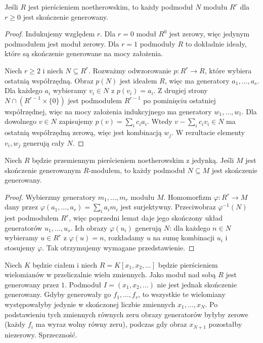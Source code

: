\begin{lemat}
\label{aa:lem:noether-submodules-free}
Jeśli $R$ jest pierścieniem noetherowskim, to każdy
podmoduł $N$ modułu $R^r$ dla $r\ge0$ jest
skończenie generowany.
\end{lemat}
\begin{proof}
Indukujemy względem $r$. Dla $r=0$ moduł $R^0$ jest zerowy,
więc jedynym podmodułem jest moduł zerowy.
Dla $r=1$ podmoduły $R$ to dokładnie ideały, które są
skończenie generowane na mocy założenia.

Niech $r\ge2$ i niech $N\subseteq R^r$.
Rozważmy odwzorowanie $p:R^r\to R$, które wybiera
ostatnią współrzędną. Obraz $p(N)$ jest ideałem $R$,
więc ma generatory $a_1,\ldots,a_s$.
Dla każdego $a_i$ wybieramy $v_i\in N$ z
$p(v_i)=a_i$. Z drugiej strony
$N\cap(R^{r-1}\times\{0\})$ jest podmodułem
$R^{r-1}$ po pominięciu ostatniej współrzędnej,
więc na mocy założenia indukcyjnego ma generatory
$w_1,\ldots,w_t$. Dla dowolnego $v\in N$ zapisujemy
$p(v)=\sum_i c_i a_i$. Wtedy
$v-\sum_i c_i v_i\in N$ ma ostatnią współrzędną zerową,
więc jest kombinacją $w_j$. W rezultacie elementy
$v_i,w_j$ generują cały $N$.
\end{proof}

\begin{twierdzenie}
\label{aa:tw:noether-submodules-fg}
Niech $R$ będzie przemiennym pierścieniem noetherowskim
z jedynką. Jeśli $M$ jest skończenie generowanym
$R$-modułem, to każdy podmoduł $N\subseteq M$
jest skończenie generowany.
\end{twierdzenie}
\begin{proof}
Wybierzmy generatory $m_1,\ldots,m_r$ modułu $M$.
Homomorfizm $\varphi:R^r\to M$ dany przez
$\varphi(a_1,\ldots,a_r)=\sum_i a_im_i$ jest
surjektywny. Przeciwobraz $\varphi^{-1}(N)$ jest
podmodułem $R^r$, więc poprzedni lemat daje jego
skończony układ generatorów $u_1,\ldots,u_s$.
Ich obrazy $\varphi(u_i)$ generują $N$: dla każdego
$n\in N$ wybieramy $u\in R^r$ z $\varphi(u)=n$,
rozkładamy $u$ na sumę kombinacji $u_i$ i stosujemy
$\varphi$. Tak otrzymujemy wymagane przedstawienie.
\end{proof}

\begin{przyklad}
\label{aa:prz:noether-need}
Niech $K$ będzie ciałem i niech $R=K[x_1,x_2,\ldots]$ będzie pierścieniem
wielomianów w przeliczalnie wielu zmiennych.
Jako moduł nad sobą $R$ jest generowany przez $1$.
Podmoduł $I=(x_1,x_2,\ldots)$ nie jest jednak
skończenie generowany. Gdyby generowały go
$f_1,\ldots,f_r$, to wszystkie te wielomiany
występowałyby jedynie w skończonej liczbie zmiennych
$x_1,\ldots,x_N$. Po podstawieniu tych zmiennych
równych zeru obrazy generatorów byłyby zerowe
(każdy $f_i$ ma wyraz wolny równy zeru), podczas gdy
obraz $x_{N+1}$ pozostałby niezerowy. Sprzeczność.
\end{przyklad}


